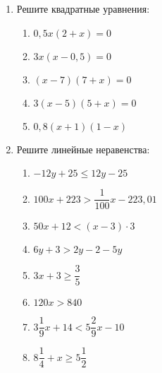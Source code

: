 \documentclass[12pt, a4paper]{article}
\begin{document}
	
	\begin{enumerate}
		\item Решите квадратные уравнения:
		\begin{multicols}{2}
			\begin{enumerate}[label=\asbuk*)]
			\item $0,5x(2+x)=0$
			\item $3x(x-0,5)=0$
			\item $(x-7)(7+x)=0$
			\item $3(x-5)(5+x)=0$
			\item $0,8(x+1)(1-x)$
		\end{enumerate}
		\end{multicols}
	\item Решите линейные неравенства:
	\begin{multicols}{2}
		\begin{enumerate}[label=\asbuk*)]
		\item $-12y+25\leqslant12y-25$
		\item $100x+223>\dfrac{1}{100}x-223,01$
		\item $50x+12<(x-3)\cdot3$
		\item $6y+3>2y-2-5y$
		\item $3x+3\geqslant\dfrac{3}{5}$
		\item $120x>840$
		\item $3\dfrac{1}{9}x+14<5\dfrac{2}{9}x-10$
		\item $8\dfrac{1}{4}+x\geqslant5\dfrac{1}{2}$
		\end{enumerate}
	\end{multicols}
	\end{enumerate}
\end{document}
